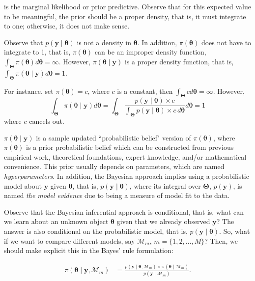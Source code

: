 is the marginal likelihood or prior predictive. Observe that for this expected value to be meaningful, the prior should be a proper density, that is, it must integrate to one; otherwise, it does not make sense.


Observe that \( p(\mathbf{y} \mid \bm{\theta}) \) is not a density in \( \bm{\theta} \). In addition, \( \pi(\bm{\theta}) \) does not have to integrate to 1, that is, \( \pi(\bm{\theta}) \) can be an improper density function, \( \int_{\mathbf{\Theta}} \pi(\bm{\theta}) d\bm{\theta} = \infty \). However, \( \pi(\bm{\theta} \mid \mathbf{y}) \) is a proper density function, that is, \( \int_{\mathbf{\Theta}} \pi(\bm{\theta} \mid \mathbf{y}) d\bm{\theta} = 1 \). 

For instance, set \( \pi(\bm{\theta}) = c \), where \( c \) is a constant, then \( \int_{\mathbf{\Theta}} c d\bm{\theta} = \infty \). However,
\[
\int_{\mathbf{\Theta}} \pi(\bm{\theta} \mid \mathbf{y}) d\bm{\theta} = \int_{\mathbf{\Theta}} \frac{p(\mathbf{y} \mid \bm{\theta}) \times c}{\int_{\mathbf{\Theta}} p(\mathbf{y} \mid \bm{\theta}) \times c \, d\bm{\theta}} d\bm{\theta} = 1
\]
where \( c \) cancels out. 

\(\pi(\bm{\theta} \mid \mathbf{y})\) is a sample updated ``probabilistic belief" version of \(\pi(\bm{\theta})\), where \(\pi(\bm{\theta})\) is a prior probabilistic belief which can be constructed from previous empirical work, theoretical foundations, expert knowledge, and/or mathematical convenience. This prior usually depends on parameters, which are named \textit{hyperparameters}. In addition, the Bayesian approach implies using a probabilistic model about \(\mathbf{y}\) given \(\bm{\theta}\), that is, \(p(\mathbf{y} \mid \bm{\theta})\), where its integral over \(\mathbf{\Theta}\), \(p(\mathbf{y})\), is named \textit{the model evidence} due to being a measure of model fit to the data.

Observe that the Bayesian inferential approach is conditional, that is, what can we learn about an unknown object \(\bm{\theta}\) given that we already observed \(\mathbf{y}\)? The answer is also conditional on the probabilistic model, that is, \(p(\mathbf{y} \mid \bm{\theta})\). So, what if we want to compare different models, say \(\mathcal{M}_m\), \(m = \{1,2,\dots,M\}\)? Then, we should make explicit this in the Bayes' rule formulation: 

\begin{align}
	\pi(\bm{\theta}\mid \mathbf{y},\mathcal{M}_m)&=\frac{p(\mathbf{y}\mid \bm{\theta},\mathcal{M}_m) \times \pi(\bm{\theta}\mid \mathcal{M}_m)}{p(\mathbf{y}\mid \mathcal{M}_m)}.
	\label{eq:122}
\end{align}

